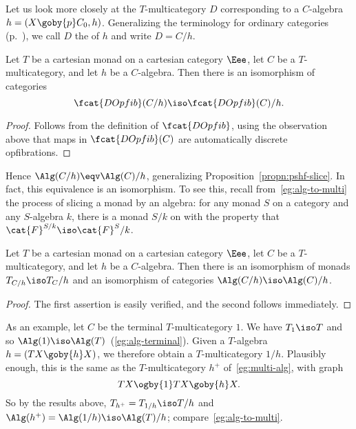 Let us look more closely at the $T$-multicategory $D$ corresponding to a
$C$-algebra $h=(X \goby{p} C_0, h)$.  Generalizing the terminology for
ordinary categories (p.~\pageref{p:defn-caty-elts}), we call $D$ the
%
%
%
%
%
%
%
of $h$ and write $D = C/h$.%
% 
% 
%
\begin{propn}	
Let $T$ be a cartesian monad on a cartesian category $\Eee$, let $C$ be a
$T$-multicategory, and let $h$ be a $C$-algebra.  Then there is an
isomorphism of categories
\[
\fcat{DOpfib}(C/h) \iso \fcat{DOpfib}(C)/h.
\]
\end{propn}
%
\begin{proof}
Follows from the definition of $\fcat{DOpfib}$, using the observation above
that maps in $\fcat{DOpfib}(C)$ are automatically discrete opfibrations.
\done
\end{proof}
%
Hence $\Alg(C/h) \eqv \Alg(C)/h$, generalizing
Proposition~\ref{propn:pshf-slice}.  In fact, this equivalence is an
isomorphism.  To see this, recall from~\ref{eg:alg-to-multi} the process of
slicing a monad by an algebra: for any monad $S$ on a category  and
any $S$-algebra $k$, there is a monad $S/k$ on  with the property
that $\cat{F}^{S/k} \iso \cat{F}^S/k$.
%
\begin{propn}	
Let $T$ be a cartesian monad on a cartesian category $\Eee$, let $C$ be a
$T$-multicategory, and let $h$ be a $C$-algebra.  Then there is an
isomorphism of monads $T_{C/h} \iso T_C /h$ and an isomorphism of
categories $\Alg(C/h) \iso \Alg(C)/h$. 
\end{propn}
%
\begin{proof}
The first assertion is easily verified, and the second follows immediately.
\done
\end{proof}

As an example, let $C$ be the terminal%
%
%
$T$-multicategory $1$.  We have $T_1
\iso T$ and so $\Alg(1) \iso \Alg(T)$~(\ref{eg:alg-terminal}).  Given a
$T$-algebra $h = (TX \goby{h} X)$, we therefore obtain a $T$-multicategory
$1/h$.  Plausibly enough, this is the same as the $T$-multicategory $h^+$
of~\ref{eg:multi-alg}, with graph
\[
TX \ogby{1} TX \goby{h} X.
\]
So by the results above, $T_{h^+} = T_{1/h} \iso T/h$ and $\Alg(h^+) =
\Alg(1/h) \iso \Alg(T)/h$; compare~\ref{eg:alg-to-multi}.


